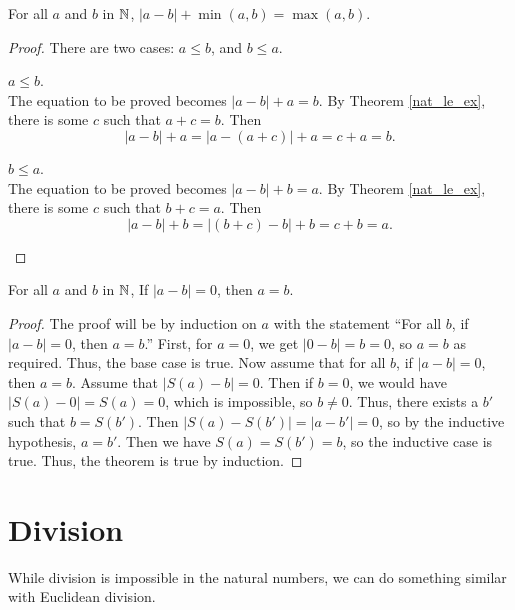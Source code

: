 \documentclass[../math.tex]{subfiles}
\begin{document}
\begin{theorem} \label{nat_abs_minus_min}
    For all $a$ and $b$ in $\mathbb{N}$, $|a - b| + \min(a, b) = \max(a, b)$.
\end{theorem}
\begin{proof}
    There are two cases: $a \leq b$, and $b \leq a$.
    \begin{case} $a \leq b$. \\
        The equation to be proved becomes $|a - b| + a = b$.  By Theorem
        \ref{nat_le_ex}, there is some $c$ such that $a + c = b$.  Then
        \[
            |a - b| + a = |a - (a + c)| + a = c + a = b.
        \]
    \end{case}
    \begin{case} $b \leq a$. \\
        The equation to be proved becomes $|a - b| + b = a$.  By Theorem
        \ref{nat_le_ex}, there is some $c$ such that $b + c = a$.  Then
        \[
            |a - b| + b = |(b + c) - b| + b = c + b = a.
        \]
    \end{case}
\end{proof}

\begin{theorem} \label{nat_abs_minus_zero}
    For all $a$ and $b$ in $\mathbb{N}$, If $|a - b| = 0$, then $a = b$.
\end{theorem}
\begin{proof}
    The proof will be by induction on $a$ with the statement ``For all $b$, if
    $|a - b| = 0$, then $a = b$.''  First, for $a = 0$, we get $|0 - b| = b =
    0$, so $a = b$ as required.  Thus, the base case is true.  Now assume that
    for all $b$, if $|a - b| = 0$, then $a = b$.  Assume that $|S(a) - b| = 0$.
    Then if $b = 0$, we would have $|S(a) - 0| = S(a) = 0$, which is impossible,
    so $b \neq 0$.  Thus, there exists a $b'$ such that $b = S(b')$.  Then
    $|S(a) - S(b')| = |a - b'| = 0$, so by the inductive hypothesis, $a = b'$.
    Then we have $S(a) = S(b') = b$, so the inductive case is true.  Thus, the
    theorem is true by induction.
\end{proof}

\section{Division}

While division is impossible in the natural numbers, we can do something similar
with Euclidean division.
\end{document}
